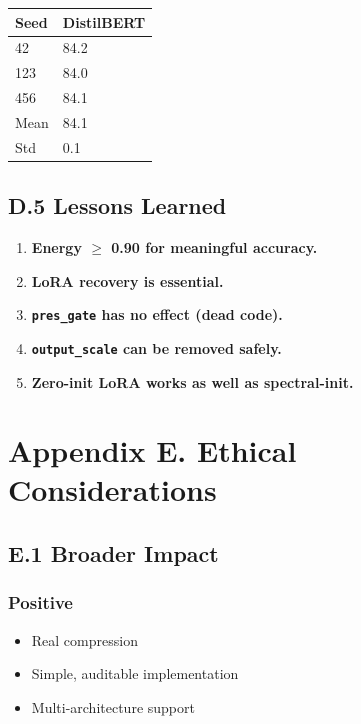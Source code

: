 \begin{table}[H]
\centering
\small
\begin{tabular}{ll}
\toprule
\textbf{Seed} & \textbf{DistilBERT} \\
\midrule
42 & 84.2 \\
123 & 84.0 \\
456 & 84.1 \\
Mean & 84.1 \\
Std & 0.1 \\
\bottomrule
\end{tabular}
\end{table}

\subsection{D.5 Lessons Learned}

\begin{enumerate}
\item \textbf{Energy $\ge$ 0.90 for meaningful accuracy.}
\item \textbf{LoRA recovery is essential.}
\item \textbf{\texttt{pres\_gate} has no effect (dead code).}
\item \textbf{\texttt{output\_scale} can be removed safely.}
\item \textbf{Zero-init LoRA works as well as spectral-init.}

\end{enumerate}


\section{Appendix E. Ethical Considerations}

\subsection{E.1 Broader Impact}

\subsubsection{Positive}
\begin{itemize}
\item Real compression
\item Simple, auditable implementation
\item Multi-architecture support

\end{itemize}
